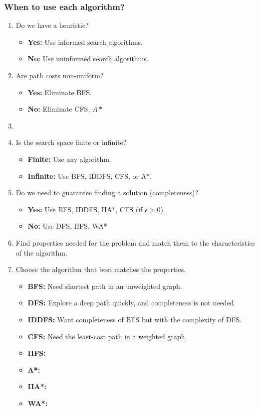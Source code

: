 \subsubsection{When to use each algorithm?}
\begin{process} 
    \begin{enumerate}
        \item Do we have a heuristic?
        \begin{itemize}
            \item \textbf{Yes:} Use informed search algorithms.
            \item \textbf{No:} Use uninformed search algorithms.
        \end{itemize}
        \item  Are path costs non-uniform?
        \begin{itemize}
            \item \textbf{Yes:} Eliminate BFS.
            \item \textbf{No:} Eliminate CFS, $A*$
        \end{itemize}
        \item 
        \item Is the search space finite or infinite? 
        \begin{itemize}
            \item \textbf{Finite:} Use any algorithm.
            \item \textbf{Infinite:} Use BFS, IDDFS, CFS, or A*.
        \end{itemize}
        \item Do we need to guarantee finding a solution (completeness)?
        \begin{itemize}
            \item \textbf{Yes:} Use BFS, IDDFS, IIA*, CFS (if $\epsilon > 0$).
            \item \textbf{No:} Use DFS, HFS, WA*
        \end{itemize}
        \item Find properties needed for the problem and match them to the characteristics of the algorithm.
        \item Choose the algorithm that best matches the properties.
        \begin{itemize}
            \item \textbf{BFS:} Need shortest path in an unweighted graph. 
            \item \textbf{DFS:} Explore a deep path quickly, and completeness is not needed.
            \item \textbf{IDDFS:} Want completeness of BFS but with the complexity of DFS.
            \item \textbf{CFS:} Need the least-cost path in a weighted graph. 
            \item \textbf{HFS:}
            \item \textbf{A*:} 
            \item \textbf{IIA*:}
            \item \textbf{WA*:}
        \end{itemize}
    \end{enumerate}
\end{process}

